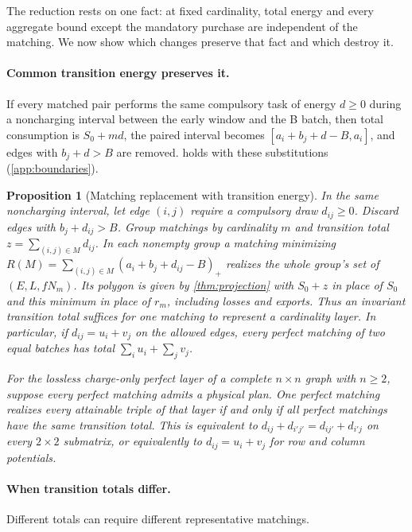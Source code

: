 \documentclass[11pt]{article}
\newtheorem{proposition}[theorem]{Proposition}
\theoremstyle{definition}\newtheorem{definition}[theorem]{Definition}
\theoremstyle{remark}\newtheorem{remark}[theorem]{Remark}
\begin{document}
The reduction rests on one fact: at fixed cardinality, total energy and every
aggregate bound except the mandatory purchase are independent of the
matching. We now show which changes preserve that fact and which destroy it.

\paragraph{Common transition energy preserves it.} If every matched pair performs
the same compulsory task of energy $d\ge0$ during a noncharging interval
between the early window and the B batch, then total consumption is $S_0+md$, the
paired interval becomes $[a_i+b_j+d-B,a_i]$, and edges with $b_j+d>B$ are removed.
 holds with these substitutions
(\cref{app:boundaries}).

\begin{proposition}[Matching replacement with transition energy]\label{prop:transitionclasses}
In the same noncharging interval, let edge $(i,j)$ require a compulsory
draw $d_{ij}\ge0$. Discard edges with $b_j+d_{ij}>B$. Group matchings by
cardinality $m$ and transition total $z=\sum_{(i,j)\in M}d_{ij}$. In each
nonempty group a matching minimizing $R(M)=\sum_{(i,j)\in M}(a_i+b_j+d_{ij}-B)_+$
realizes the whole group's set of $(E,L,fN_m)$. Its polygon is given by
\cref{thm:projection} with $S_0+z$ in place of $S_0$ and this minimum in
place of $r_m$, including losses and exports. Thus an invariant transition
total suffices for one matching to represent a cardinality layer. In particular,
if $d_{ij}=u_i+v_j$ on the allowed edges, every perfect matching of two
equal batches has total $\sum_i u_i+\sum_j v_j$.

For the lossless charge-only perfect layer of a complete $n\times n$ graph
with $n\ge2$, suppose every perfect matching admits a physical plan. One
perfect matching realizes every attainable triple of that layer if and only
if all perfect matchings have the same transition total. This is equivalent
to $d_{ij}+d_{i'j'}=d_{ij'}+d_{i'j}$ on every $2\times2$ submatrix, or
equivalently to $d_{ij}=u_i+v_j$ for row and column potentials.
\end{proposition}

\paragraph{When transition totals differ.}
Different totals can require different representative matchings.
\end{document}
